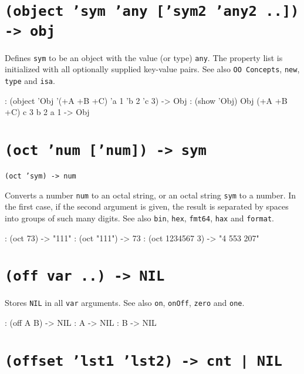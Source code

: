  
\section*{\texttt{(object 'sym 'any ['sym2 'any2 ..]) -> obj}}
\label{sec:func-ref-O-(object 'sym 'any ['sym2 'any2 ..]) -> obj}


Defines \texttt{sym} to be an object with the value (or type) \texttt{any}. The
property list is initialized with all optionally supplied key-value
pairs. See also \texttt{OO Concepts}, \texttt{new}, \texttt{type} and \texttt{isa}.


\begin{wideverbatim}
: (object 'Obj '(+A +B +C) 'a 1 'b 2 'c 3)
-> Obj
: (show 'Obj)
Obj (+A +B +C)
   c 3
   b 2
   a 1
-> Obj
\end{wideverbatim}

 
\section*{\texttt{(oct 'num ['num]) -> sym}}
\label{sec:func-ref-O-(oct 'num ['num]) -> sym}


\texttt{(oct 'sym) -> num}

Converts a number \texttt{num} to an octal string, or an octal string \texttt{sym} to
a number. In the first case, if the second argument is given, the result
is separated by spaces into groups of such many digits. See also \texttt{bin},
\texttt{hex}, \texttt{fmt64}, \texttt{hax} and \texttt{format}.


\begin{wideverbatim}
: (oct 73)
-> "111"
: (oct "111")
-> 73
: (oct 1234567 3)
-> "4 553 207"
\end{wideverbatim}

 
\section*{\texttt{(off var ..) -> NIL}}
\label{sec:func-ref-O-(off var ..) -> NIL}


Stores \texttt{NIL} in all \texttt{var} arguments. See also \texttt{on}, \texttt{onOff}, \texttt{zero} and
\texttt{one}.


\begin{wideverbatim}
: (off A B)
-> NIL
: A
-> NIL
: B
-> NIL
\end{wideverbatim}

 
\section*{\texttt{(offset 'lst1 'lst2) -> cnt | NIL}}
\label{sec:func-ref-O-(offset 'lst1 'lst2) -> cnt | NIL}


